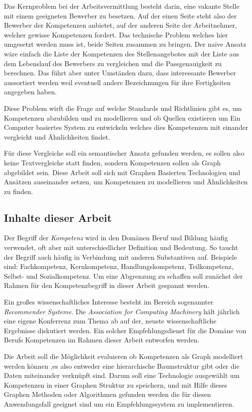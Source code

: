 Das Kernproblem bei der Arbeitsvermittlung besteht darin, eine vakante Stelle mit einem geeigneten Bewerber zu besetzen. Auf der einen Seite steht also der Bewerber der Kompetenzen anbietet, auf der anderen Seite der Arbeitnehmer, welcher gewisse Kompetenzen fordert. Das technische Problem welches hier umgesetzt werden muss ist, beide Seiten zusammen zu bringen. Der naive Ansatz wäre einfach die Liste der Kompetenzen des Stellenangebotes mit der Liste aus dem Lebenslauf des Bewerbers zu vergleichen und die Passgenauigkeit zu berechnen. Das führt aber unter Umständen dazu, dass interessante Bewerber aussortiert werden weil eventuell andere Bezeichnungen für ihre Fertigkeiten angegeben haben. 

Diese Problem wirft die Frage auf welche Standards und Richtlinien gibt es, um Kompetenzen abzubilden und zu modellieren 
und ob Quellen existieren um Ein Computer basiertes System zu entwickeln welches dies Kompetenzen mit einander vergleicht und Ähnlichkeiten findet. 

Für diese Vergleiche soll ein semantischer Ansatz gefunden werden, es sollen also keine Textvergleiche statt finden, sondern Kompetenzen sollen als Graph abgebildet sein.
Diese Arbeit soll sich mit Graphen Basierten Technologien und Ansätzen auseinander setzen, um Kompetenzen zu modellieren und Ähnlichkeiten zu finden.

\subsection{Inhalte dieser Arbeit}


Der Begriff der \textit{Kompetenz} wird in den Domänen Beruf und Bildung häufig verwendet, oft aber mit unterschiedlicher Definition und Bedeutung. So taucht der Begriff auch häufig in Verbindung mit anderen Substantiven auf. Beispiele sind: Fachkompetenz, Kernkompetenz, Handlungskompetenz, Teilkompetenz, Selbst- und Sozialkompetenz.
Um eine Abgrenzung zu schaffen soll zunächst der Rahmen für den Kompetenzbegriff in dieser Arbeit gespannt werden. 

Ein großes wissenschaftliches Interesse besteht im Bereich sogenannter \textit{Recommender Systeme}. Die \textit{Association for Computing Machinery} hält jährlich eine eigene Konferrenz zum Thema ab auf der, neuste wissenschaftliche Ergebnisse diskutiert werden. Ein solcher Empfehlungsdienst für die Domäne von Berufs Kompetenzen im Rahmen dieser Arbeit entworfen werden.

Die Arbeit soll die Möglichkeit evaluieren ob Kompetenzen als Graph modelliert werden können ,es also entweder eine hierarchische Baumstruktur gibt oder die Daten miteinander verknüpft sind. Darum soll eine Technologie ausgewählt um Kompetenzen in einer Graphen Struktur zu speichern, und mit Hilfe dieses Graphen Methoden oder Algorithmen gefunden werden die für diesen Anwendungsfall geeignet sind um ein Empfehlungssystem zu implementieren.
